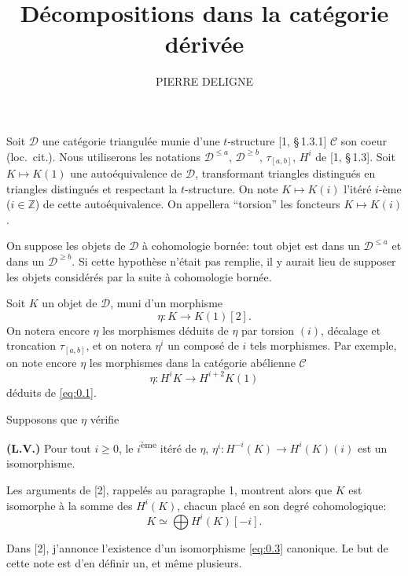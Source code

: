 \documentclass[11pt,a4paper]{article}
\title{\textbf{D\'ecompositions dans la cat\'egorie d\'eriv\'ee}}
\author{PIERRE DELIGNE}
\date{}
\theoremstyle{plain}
\theoremstyle{definition}
\newcommand{\cD}{\mathscr{D}}
\newcommand{\cC}{\mathscr{C}}
\begin{document}
\maketitle
\thispagestyle{empty}

Soit $\cD$ une cat\'egorie triangul\'ee munie d'une $t$-structure [1, \S\,1.3.1] $\cC$ son coeur (loc.~cit.). Nous utiliserons les notations $\cD^{\leqslant a}$, $\cD^{\geqslant b}$, $\tau_{[a,b]}$, $H^i$ de [1, \S\,1.3]. Soit $K \mapsto K(1)$ une auto\'equivalence de $\cD$, transformant triangles distingu\'es en triangles distingu\'es et respectant la $t$-structure. On note $K \mapsto K(i)$ l'it\'er\'e $i$-\`eme ($i \in \mathbb{Z}$) de cette auto\'equivalence. On appellera ``torsion'' les foncteurs $K \mapsto K(i)$.

On suppose les objets de $\cD$ \`a cohomologie born\'ee: tout objet est dans un $\cD^{\leqslant a}$ et dans un $\cD^{\geqslant b}$. Si cette hypoth\`ese n'\'etait pas remplie, il y aurait lieu de supposer les objets consid\'er\'es par la suite \`a cohomologie born\'ee.

Soit $K$ un objet de $\cD$, muni d'un morphisme
\begin{equation}\label{eq:0.1}
\eta \colon K \to K(1)[2].
\end{equation}
On notera encore $\eta$ les morphismes d\'eduits de $\eta$ par torsion $(i)$, d\'ecalage et troncation $\tau_{[a,b]}$, et on notera $\eta^i$ un compos\'e de $i$ tels morphismes. Par exemple, on note encore $\eta$ les morphismes dans la cat\'egorie ab\'elienne $\cC$
\begin{equation}\label{eq:0.2}
\eta \colon H^i K \to H^{i+2} K(1)
\end{equation}
d\'eduits de \eqref{eq:0.1}.

Supposons que $\eta$ v\'erifie

\smallskip
\noindent\textbf{(L.V.)} Pour tout $i \geqslant 0$, le $i$\textsuperscript{\`eme} it\'er\'e de $\eta$, $\eta^i \colon H^{-i}(K) \to H^i(K)(i)$ est un isomorphisme.
\smallskip

Les arguments de [2], rappel\'es au paragraphe 1, montrent alors que $K$ est isomorphe \`a la somme des $H^i(K)$, chacun plac\'e en son degr\'e cohomologique:
\begin{equation}\label{eq:0.3}
K \simeq \bigoplus H^i(K)[-i].
\end{equation}

Dans [2], j'annonce l'existence d'un isomorphisme \eqref{eq:0.3} canonique. Le but de cette note est d'en d\'efinir un, et m\^eme plusieurs.
\end{document}
